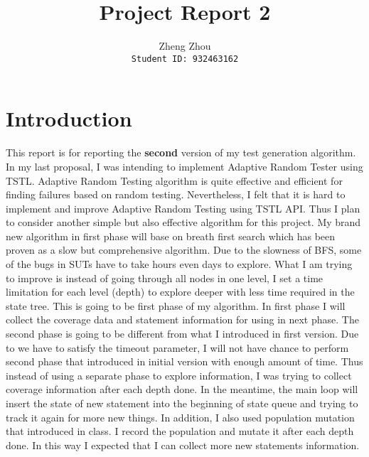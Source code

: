 \documentclass[11pt]{article}
\theoremstyle{plain}
\theoremstyle{definition}
\begin{document}
\title{Project Report 2}
\author{Zheng Zhou \\ \texttt{Student ID: 932463162}}

\maketitle

\section{Introduction}
This report is for reporting the \textbf{second} version of my test generation algorithm. In my last proposal, I was intending to implement Adaptive Random Tester using TSTL. Adaptive Random Testing algorithm is quite effective and efficient for finding failures based on random testing. Nevertheless, I felt that it is hard to implement and improve Adaptive Random Testing using TSTL API. Thus I plan to consider another simple but also effective algorithm for this project. My brand new algorithm in first phase will base on breath first search which has been proven as a slow but comprehensive algorithm. Due to the slowness of BFS, some of the bugs in SUTs have to take hours even days to explore. What I am trying to improve is instead of going through all nodes in one level, I set a time limitation for each level (depth) to explore deeper with less time required in the state tree. This is going to be first phase of my algorithm. In first phase I will collect the coverage data and statement information for using in next phase. The second phase is going to be different from what I introduced in first version. Due to we have to satisfy the timeout parameter, I will not have chance to perform second phase that introduced in initial version with enough amount of time. Thus instead of using a separate phase to explore information, I was trying to collect coverage information after each depth done. In the meantime, the main loop will insert the state of new statement into the beginning of state queue and trying to track it again for more new things. In addition, I also used population mutation that introduced in class. I record the population and mutate it after each depth done. In this way I expected that I can collect more new statements information.
\end{document}
